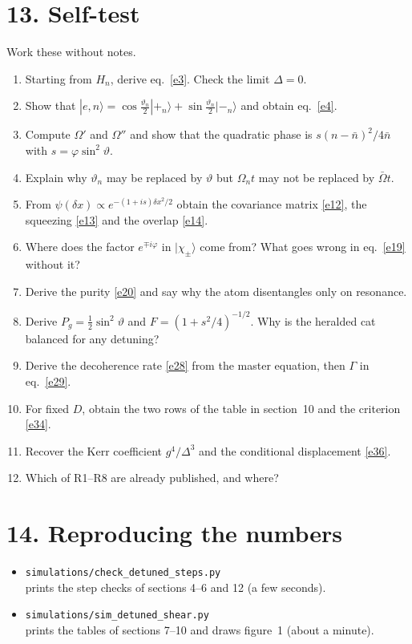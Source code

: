 \documentclass[11pt,letterpaper]{article}
\newcommand{\nbar}{\bar{n}}
\newcommand{\Obar}{\bar{\Omega}}
\newcommand{\ket}[1]{|#1\rangle}
\begin{document}
\section*{13. Self-test}
Work these without notes.
\begin{enumerate}[nosep,leftmargin=1.5em]
\item Starting from $H_n$, derive eq.~\eqref{e3}. Check the limit $\Delta=0$.
\item Show that $\ket{e,n}=\cos\tfrac{\vartheta_n}{2}\ket{+_n}+\sin\tfrac{\vartheta_n}{2}\ket{-_n}$ and obtain eq.~\eqref{e4}.
\item Compute $\Omega'$ and $\Omega''$ and show that the quadratic phase is $s(n-\nbar)^2/4\nbar$ with $s=\varphi\sin^2\vartheta$.
\item Explain why $\vartheta_n$ may be replaced by $\vartheta$ but $\Omega_nt$ may not be replaced by $\Obar t$.
\item From $\psi(\delta x)\propto e^{-(1+is)\delta x^2/2}$ obtain the covariance matrix \eqref{e12}, the squeezing \eqref{e13} and the overlap \eqref{e14}.
\item Where does the factor $e^{\mp i\varphi}$ in $\ket{\chi_\pm}$ come from? What goes wrong in eq.~\eqref{e19} without it?
\item Derive the purity \eqref{e20} and say why the atom disentangles only on resonance.
\item Derive $P_g=\tfrac12\sin^2\vartheta$ and $F=(1+s^2/4)^{-1/2}$. Why is the heralded cat balanced for any detuning?
\item Derive the decoherence rate \eqref{e28} from the master equation, then $\Gamma$ in eq.~\eqref{e29}.
\item For fixed $D$, obtain the two rows of the table in section~10 and the criterion \eqref{e34}.
\item Recover the Kerr coefficient $g^4/\Delta^3$ and the conditional displacement \eqref{e36}.
\item Which of R1--R8 are already published, and where?
\end{enumerate}

\section*{14. Reproducing the numbers}
\begin{itemize}[nosep,leftmargin=1.5em]
\item \texttt{simulations/check\_detuned\_steps.py}\\ prints the step checks of sections 4--6 and 12 (a few seconds).
\item \texttt{simulations/sim\_detuned\_shear.py}\\ prints the tables of sections 7--10 and draws figure~1 (about a minute).
\end{itemize}
\end{document}

